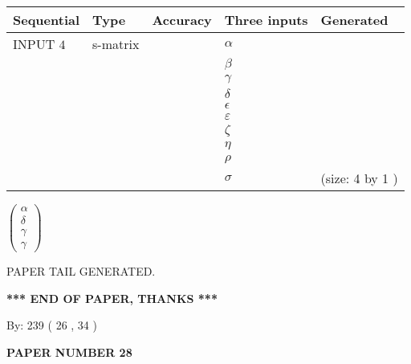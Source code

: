 \documentclass[12pt]{article}
\begin{document}
  
\noindent\begin{tabular}{|l|l|l|l|l|}
\hline
 Sequential & Type & Accuracy & Three inputs & Generated \\ 
\hline
 
 
  INPUT $  4 $ & s-matrix & & 
 $  \alpha $ & 
  \\
  & & & 
 $  \beta $ & 
  \\
  & & & 
 $  \gamma $ & 
  \\
  & & & 
 $  \delta $ & 
  \\
  & & & 
 $  \epsilon $ & 
  \\
  & & & 
 $  \varepsilon $ & 
  \\
  & & & 
 $                     \zeta $ & 
  \\
  & & & 
 $  \eta $ & 
  \\
  & & & 
 $  \rho $ & 
  \\
  & & & 
 $  \sigma $ & 
  (size:  4  by  1 )
 \\  \hline  
 \end{tabular}
   
   
 $  \left( \begin{array}
 {
 c
 }
 \alpha \\ 
 \delta \\ 
 \gamma \\ 
 \gamma
 \end{array} \right) $ 
   
   
   
   
 \vspace{0.2in}
 
   
   
\vspace{2.0in} PAPER TAIL GENERATED.
   
   
   
   
\vspace{1.0in} 
{\textbf{\large{ *** END OF PAPER, THANKS *** }}} 
   
   
\hspace{1.0in} By: 
 239 ( 26 ,  34 )
   
   
   
   
\newpage 
\setcounter{page}{ 
    28001 } 
   
   
   
   
 {\textbf{ \Large{ PAPER NUMBER  28  }}}
   
   
\vspace{0.2in}
   
   
   
\end{document}
